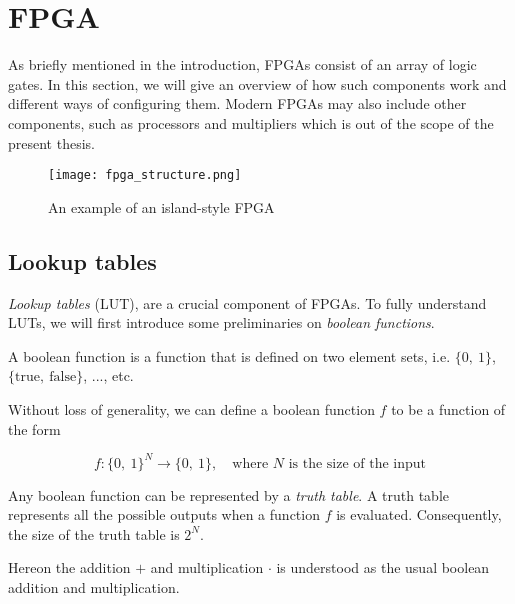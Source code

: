 \chapter{FPGA\label{FPGA}}
As briefly mentioned in the introduction, FPGAs consist of an array of logic
gates. In this section, we will give an overview of how such components work
and different ways of configuring them. Modern FPGAs may also include other
components, such as processors and multipliers which is out of the scope of the
present thesis.

\begin{figure}[H]
    \centering
    \texttt{[image: fpga\_structure.png]}
    \caption{An example of an island-style FPGA\citep{M.MorrisMano3}}
    \label{fig:fpga_structure}
\end{figure}


\section{Lookup tables}

\textit{Lookup tables} (LUT), are a crucial component of FPGAs. To fully
understand LUTs, we will first introduce some preliminaries on \textit{boolean
functions}.

\begin{definition}
    A boolean function is a function that is defined on two element sets, i.e.
    $\{0,\ 1\}$, $\{\text{true},\ \text{false}\}$, ..., etc.

    Without loss of generality, we can define a boolean function $f$ to be a
    function of the form

    \[f \colon \{0,\ 1\}^N \rightarrow \{0,\ 1\}, \quad \text{where $N$ is the
    size of the input}\]

    Any boolean function can be represented by a \textit{truth table}. A truth
    table represents all the possible outputs when a function $f$ is evaluated.
    Consequently, the size of the truth table is $2^N$.
\end{definition}

Hereon the addition $+$ and multiplication $\cdot$ is understood as the
usual boolean addition and multiplication.

